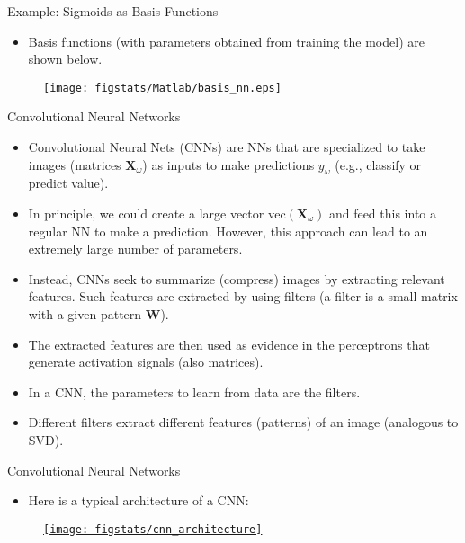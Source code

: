 \documentclass[9pt]{beamer}
\begin{document}
\begin{frame}{Example: Sigmoids as Basis Functions}

\begin{itemize}
\item Basis functions (with parameters obtained from training the model) are shown below. 
\end{itemize}


\begin{figure}[!htb]
    \centering
	\texttt{[image: figstats/Matlab/basis\_nn.eps]}
\end{figure}


\end{frame}

\begin{frame}{Convolutional Neural Networks}

\begin{itemize}
\item Convolutional Neural Nets (CNNs) are NNs that are specialized to take images (matrices $\mathbf{X}_\omega$) as inputs to make predictions $y_\omega$ (e.g., classify or predict value). 
\item In principle, we could create a large vector $\textrm{vec}(\mathbf{X}_\omega)$ and feed this into a regular NN to make a prediction. However, this approach can lead to an extremely large number of parameters. 
\item Instead, CNNs seek to summarize (compress) images by extracting relevant features. Such features are extracted by using filters (a filter is a small matrix with a given pattern $\mathbf{W}$). 
\item The extracted features are then used as evidence in the perceptrons that generate activation signals (also matrices).
\item In a CNN, the parameters to learn from data are the filters.
\item Different filters extract different features (patterns) of an image (analogous to SVD). 
\end{itemize}


\end{frame}

\begin{frame}{Convolutional Neural Networks}

\begin{itemize}
\item Here is a typical architecture of a CNN:
\end{itemize}

\begin{figure}[!htb]
    \centering
	\href{https://towardsdatascience.com/a-comprehensive-guide-to-convolutional-neural-networks-the-eli5-way-3bd2b1164a53}{\texttt{[image: figstats/cnn\_architecture]}}
\end{figure}

\end{frame}
\end{document}
